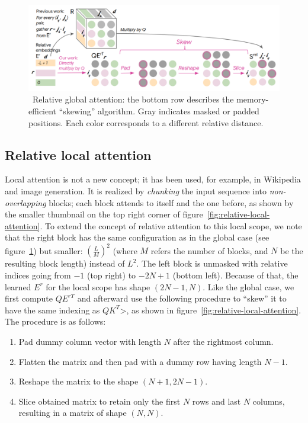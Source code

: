 \begin{figure}
    \centering
    \includegraphics[width=\textwidth]{assets/rel-attention-skew}
    \caption{~Relative global attention: the bottom row describes the memory-efficient ``skewing'' algorithm. Gray indicates masked or padded positions. Each color corresponds to a different relative distance.~\cite{music-transformer}}\label{fig:rel-attention-skew}
\end{figure}

\subsection{Relative local attention}\label{subsec:relative-local-attention}

Local attention is not a new concept;
it has been used, for example, in Wikipedia and image generation\cite{sumarizing-wikipedia}.
It is realized by \textit{chunking} the input sequence into \textit{non-overlapping} blocks;
each block attends to itself and the one before, as shown by the smaller thumbnail on the top right corner of figure~\ref{fig:relative-local-attention}.
To extend the concept of relative attention to this local scope, we note that the right block has the same configuration as in the global case (see figure~\ref{fig:rel-attention-skew}) but smaller: $( \frac{L}{M} )^2$ (where $M$ refers the number of blocks, and $N$ be the resulting block length) instead of $L^2$.
The left block is unmasked with relative indices going from $-1$ (top right) to $-2N + 1$ (bottom left).
Because of that, the learned $E^r$ for the local scope has shape $(2N - 1, N)$.
Like the global case, we first compute $QE^{rT}$ and afterward use the following procedure to ``skew'' it to have the same indexing as $QK^T$>, as shown in figure~\ref{fig:relative-local-attention}.
The procedure is as follows\cite{music-transformer}:
\begin{enumerate}
    \item Pad dummy column vector with length $N$ after the rightmost column.
    \item Flatten the matrix and then pad with a dummy row having length $N - 1$.
    \item Reshape the matrix to the shape $(N + 1, 2N - 1)$.
    \item Slice obtained matrix to retain only the first $N$ rows and last $N$ columns, resulting in a matrix of shape $(N, N)$.
\end{enumerate}



